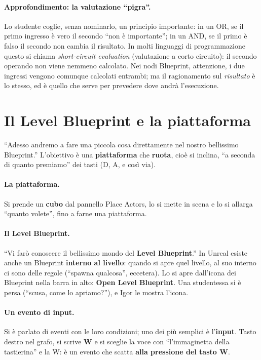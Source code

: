 \paragraph{Approfondimento: la valutazione ``pigra''.} Lo studente coglie, senza
nominarlo, un principio importante: in un OR, se il primo ingresso è vero il secondo
``non è importante''; in un AND, se il primo è falso il secondo non cambia il risultato.
In molti linguaggi di programmazione questo si chiama \emph{short-circuit evaluation}
(valutazione a corto circuito): il secondo operando non viene nemmeno calcolato. Nei
nodi Blueprint, attenzione, i due ingressi vengono comunque calcolati entrambi; ma il
ragionamento sul \emph{risultato} è lo stesso, ed è quello che serve per prevedere dove
andrà l'esecuzione.

\section{Il Level Blueprint e la piattaforma}
\label{ue2:sec:level}

``Adesso andremo a fare una piccola cosa direttamente nel nostro bellissimo Blueprint.''
L'obiettivo è una \textbf{piattaforma} che \textbf{ruota}, cioè si inclina, ``a seconda
di quanto premiamo'' dei tasti (D, A, e così via).

\paragraph{La piattaforma.} Si prende un \textbf{cubo} dal pannello Place Actors, lo si
mette in scena e lo si allarga ``quanto volete'', fino a farne una piattaforma.

\paragraph{Il Level Blueprint.} ``Vi farò conoscere il bellissimo mondo del \textbf{Level
Blueprint}.'' In Unreal esiste anche un Blueprint \textbf{interno al livello}: quando si
apre quel livello, al suo interno ci sono delle regole (``spawna qualcosa'', eccetera).
Lo si apre dall'icona dei Blueprint nella barra in alto: \textbf{Open Level Blueprint}.
Una studentessa si è persa (``scusa, come lo apriamo?''), e Igor le mostra l'icona.

\paragraph{Un evento di input.} Si è parlato di eventi con le loro condizioni; uno dei più
semplici è l'\textbf{input}. Tasto destro nel grafo, si scrive \textbf{W} e si sceglie
la voce con ``l'immaginetta della tastierina'' e la W: è un evento che scatta
\textbf{alla pressione del tasto W}.

